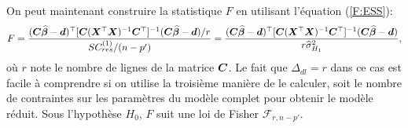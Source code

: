 On peut maintenant construire la statistique $F$ en utilisant l'équation (\ref{F:ESS}):
\begin{equation*}\label{F:lingen}
F={({\bm{C}}\widehat{\bm\beta}-{\bm{d}})^\top[{\bm{C}}(\bm{X}^\top\bm{X})^{-1}{\bm{C}}^\top]^{-1}({\bm{C}}\widehat{\bm\beta}-{\bm{d}})/r\over
SC^{(1)}_{res}/(n-p')}={
({\bm{C}}\widehat{\bm\beta}-{\bm{d}})^\top[{\bm{C}}(\bm{X}^\top\bm{X})^{-1}{\bm{C}}^\top]^{-1}({\bm{C}}\widehat{\bm\beta}-{\bm{d}})\over
r\widehat\sigma^2_{H_1}},
\end{equation*}
où $r$ note le nombre de lignes de la matrice ${\bm{C}}$.
Le fait que $\Delta_{dl}=r$ dans ce cas est facile \`a comprendre si on utilise la troisième manière de le calculer, soit le nombre de contraintes sur les param\`etres du mod\`ele complet pour
obtenir le mod\`ele réduit. Sous l'hypothèse $H_0$, $F$ suit une loi de Fisher $\mathcal{F}_{r,n-p'}.$
